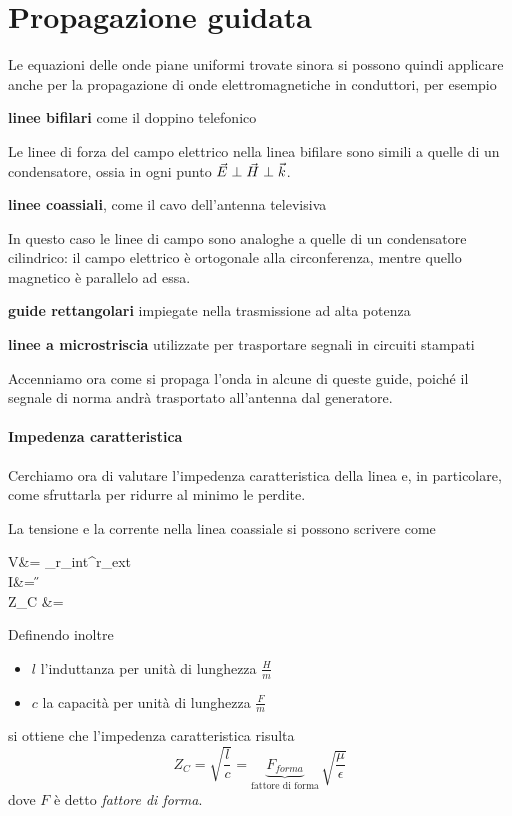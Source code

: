 \section{Propagazione guidata}
Le equazioni delle onde piane uniformi trovate sinora si possono quindi applicare anche per la propagazione di onde elettromagnetiche in conduttori, per esempio
\begin{description}
	\item \textbf{linee bifilari} come il doppino telefonico

	Le linee di forza del campo elettrico nella linea bifilare sono simili a quelle di un condensatore, ossia in ogni punto $\vec{E}\perp\vec{H}\perp\vec{k}$.

	\item \textbf{linee coassiali}, come il cavo dell'antenna televisiva

	In questo caso le linee di campo sono analoghe a quelle di un condensatore cilindrico: il campo elettrico è ortogonale alla circonferenza, mentre quello magnetico è parallelo ad essa.

	\item \textbf{guide rettangolari} impiegate nella trasmissione ad alta potenza

	\item \textbf{linee a microstriscia} utilizzate per trasportare segnali in circuiti stampati
\end{description}
Accenniamo ora come si propaga l'onda in alcune di queste guide, poiché il segnale di norma andrà trasportato all'antenna dal generatore.

\paragraph{Impedenza caratteristica}
Cerchiamo ora di valutare l'impedenza caratteristica della linea e, in particolare, come sfruttarla per ridurre al minimo le perdite.

La tensione e la corrente nella linea coassiale si possono scrivere come
\begin{esp}
	V&= \int_{r_{int}}^{r_{ext}} \E \cdot \de {} \\
	I&= \oint \H \cdot \de {} \\
	\implies Z_C &=  
\end{esp}
Definendo inoltre
\begin{itemize}
	\item $l$ l'induttanza per unità di lunghezza $\frac{H}{m}$
	\item $c$ la capacità per unità di lunghezza $\frac{F}{m}$
\end{itemize}
si ottiene che l'impedenza caratteristica risulta
\begin{equation}
  Z_C = \sqrt{\frac{l}{c}} = \underbrace{F_{forma}}_{\text{fattore di forma}} \, \sqrt{\frac{\mu}{\epsilon}}
\end{equation}
dove $F$ è detto \emph{fattore di forma}.

